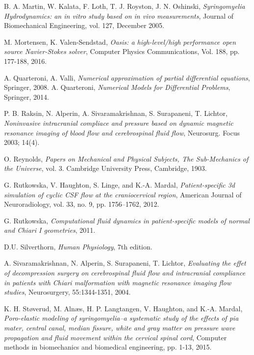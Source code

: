 \documentclass[a4paper,11pt,openright,twoside]{book}
\begin{document}
\begin{thebibliography}{100}
 B. A. Martin, W. Kalata, F. Loth, T. J. Royston, J. N. Oshinski, \emph{Syringomyelia Hydrodynamics: an in vitro study based on in vivo measurements}, Journal of Biomechanical Engineering, vol. 127, December 2005.


 M. Mortensen, K. Valen-Sendstad, \emph{Oasis: a high-level/high performance open source Navier-Stokes solver}, Computer Physics Communications, Vol. 188, pp. 177-188, 2016.

 A. Quarteroni, A. Valli, \emph{Numerical approximation of partial differential equations}, Springer, 2008.
 A. Quarteroni, \emph{Numerical Models for Differential Problems}, Springer, 2014.

 P. B. Raksin, N. Alperin, A. Sivaramakrishnan, S. Surapaneni, T. Lichtor, \emph{Noninvasive intracranial compliace and pressure based on dynamic magnetic resonance imaging of blood flow and cerebrospinal fluid flow}, Neurosurg. Focus 2003; 14(4).

 O. Reynolds, \emph{Papers on Mechanical and Physical Subjects, The Sub-Mechanics of the Universe}, vol. 3. Cambridge University Press, Cambridge, 1903.

  G. Rutkowska, V. Haughton, S. Linge, and K.-A. Mardal, \emph{Patient-specific 3d simulation of cyclic CSF flow at the craniocervical region}, American Journal of Neuroradiology, vol. 33, no. 9, pp. 1756–1762, 2012.

 G. Rutkowska, \emph{Computational fluid dynamics in patient-specific models of normal and Chiari I geometries}, 2011.

 D.U. Silverthorn, \emph{Human Physiology}, 7th edition.

 A. Sivaramakrishnan, N. Alperin, S. Surapaneni, T. Lichtor, \emph{Evaluating the effet of decompression surgery on cerebrospinal fluid flow and intracranial compliance in patients with Chiari malformation with magnetic resonance imaging flow studies}, Neurosurgery, 55:1344-1351, 2004.

 K. H. Støverud, M. Alnæs, H. P. Langtangen, V. Haughton, and K.-A. Mardal, \emph{Poro-elastic modeling of syringomyelia–a systematic study of the effects of pia mater, central canal, median fissure, white and gray matter on pressure wave propagation and fluid movement within the cervical spinal cord}, Computer methods in biomechanics and biomedical engineering, pp. 1-13, 2015.


\end{thebibliography}
\end{document}
